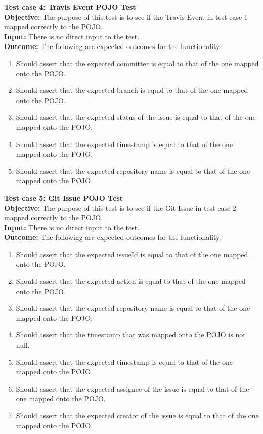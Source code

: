 \documentclass[11pt,a4paper]{article}
\begin{document}
\noindent
\textbf{Test case 4: Travis Event POJO Test} \\
\textbf{Objective: } The purpose of this test is to see if the Travis Event in test case 1 mapped correctly to the POJO. \\
\textbf{Input: } There is no direct input to the test. \\
\textbf{Outcome: } The following are expected outcomes for the functionality:
\begin{enumerate}
	\item Should assert that the expected committer is equal to that of the one mapped onto the POJO.
	\item Should assert that the expected branch is equal to that of the one mapped onto the POJO.
	\item Should assert that the expected status of the issue is equal to that of the one mapped onto the POJO.
	\item Should assert that the expected timestamp is equal to that of the one mapped onto the POJO.
	\item Should assert that the expected repository name is equal to that of the one mapped onto the POJO.\\
\end{enumerate}
\noindent
\textbf{Test case 5: Git Issue POJO Test} \\
\textbf{Objective: } The purpose of this test is to see if the Git Issue in test case 2 mapped correctly to the POJO. \\
\textbf{Input: } There is no direct input to the test. \\
\textbf{Outcome: } The following are expected outcomes for the functionality:
\begin{enumerate}
	\item Should assert that the expected issueId is equal to that of the one mapped onto the POJO.
	\item Should assert that the expected action is equal to that of the one mapped onto the POJO.
	\item Should assert that the expected repository name is equal to that of the one mapped onto the POJO.
	\item Should assert that the timestamp that was mapped onto the POJO is not null.
	\item Should assert that the expected timestamp is equal to that of the one mapped onto the POJO.
	\item Should assert that the expected assignee of the issue is equal to that of the one mapped onto the POJO.
	\item Should assert that the expected creator of the issue is equal to that of the one mapped onto the POJO.\\
\end{enumerate}
\end{document}
